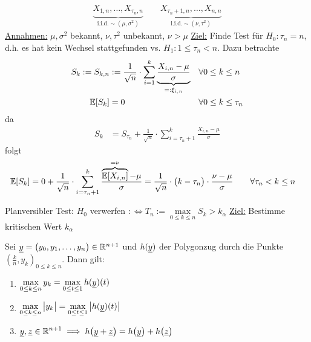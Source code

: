 \begin{align*}
	\underbrace{X_{1,n},\ldots,X_{\tau_n,n}}_{\text{i.i.d.}\sim(\mu,\sigma^2)}\qquad\underbrace{X_{\tau_n+1,n},\ldots,X_{n,n}}_{\text{i.i.d.}\sim(\nu,\tau^2)}
\end{align*}
\underline{Annahmen:} $\mu,\sigma^2$ bekannt, $\nu,\tau^2$ unbekannt, $\nu>\mu$\nl
\underline{Ziel:} Finde Test für 
$H_0:\tau_n=n$, d.h. es hat kein Wechsel stattgefunden vs. $H_1:1\leq\tau_n<n$. Dazu betrachte
\begin{align*}
	S_k:=S_{k,n}&:=\frac{1}{\sqrt{n}}\cdot\sum\limits_{i=1}^k\underbrace{\frac{X_{i,n}-\mu}{\sigma}}_{=:\xi_{i,n}}&\forall& 0\leq k\leq n\\
	\mathbb{E}[S_k]&=0\qquad	&\forall& 0\leq k\leq\tau_n
\end{align*}
da
\begin{align*}
	S_k&=S_{\tau_n}+\frac{1}{\sqrt{n}}\cdot\sum\limits_{i=\tau_n+1}^k\frac{X_{i,n}-\mu}{\sigma}
\end{align*}
folgt
\begin{align*}
	\mathbb{E}[S_k]
	&=0+\frac{1}{\sqrt{n}}\cdot\sum\limits_{i=\tau_n+1}^k\frac{\overbrace{\mathbb{E}[X_{i,n}]}^{=\nu}-\mu}{\sigma}
	=\frac{1}{\sqrt{n}}\cdot\big(k-\tau_n\big)\cdot\frac{\nu-\mu}{\sigma}\qquad\forall\tau_n<k\leq n
\end{align*}

Planversibler Test:
$H_0$ verwerfen $:\Longleftrightarrow T_n:=\max\limits_{0\leq k\leq n} S_k>k_\alpha$\nl
\underline{Ziel:} Bestimme kritischen Wert $k_\alpha$

\begin{lemma}\label{lemma7.17}
	Sei $\underline{y}=\big(y_0,y_1,\ldots,y_n\big)\in\mathbb{R}^{n+1}$ und $h(\underline{y})$ der Polygonzug durch die Punkte $\left(\frac{k}{n},y_k\right)_{0\leq k\leq n}$. 
	Dann gilt:
	\begin{enumerate}[label=(\arabic*)]
		\item $\begin{aligned}
			\max\limits_{0\leq k\leq n}y_k=\max\limits_{0\leq t\leq 1} h(\underline{y})(t)
		\end{aligned}$
		\item $\begin{aligned}
			\max\limits_{0\leq k\leq n}\big|y_k\big|=\max\limits_{0\leq t\leq 1} \big|h(\underline{y})(t)\big|
		\end{aligned}$
		\item $\begin{aligned}
			\underline{y},\underline{z}\in\mathbb{R}^{n+1}\implies h\big(\underline{y}+\underline{z}\big)=h\big(\underline{y}\big)+h\big(\underline{z}\big)
		\end{aligned}$
	\end{enumerate}
\end{lemma}

